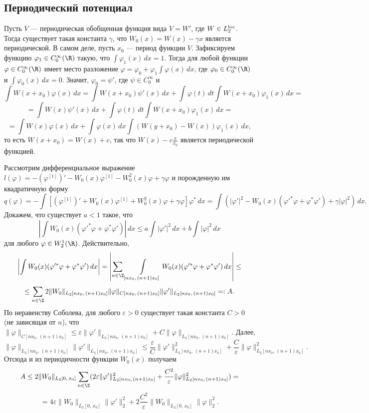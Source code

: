 \documentclass[a4paper
]{article}
\begin{document}
\subsection{Периодический потенциал}
Пусть $V$ --- периодическая обобщенная функция вида $V=W'$, где $W\in
L_2^{{\rm loc}}$. Тогда существует такая константа $\gamma$, что
$W_0(x)=W(x)-\gamma x$ является периодической. В самом деле, пусть
$x_0$ --- период функции $V$. Зафиксируем
функцию $\varphi_1\in C_0^\infty(\R)$ такую, что $\int \varphi_1(x)\, dx
=1$. Тогда для любой функции $\varphi\in C_0^\infty(\R)$ имеет
место разложение $\varphi=\varphi_0+\varphi_1\int \varphi(x)\, dx$,
где $\varphi_0\in C_0^\infty(\R)$ и $\int \varphi_0(x)\, dx=0$.
Значит, $\varphi_0=\psi'$, где $\psi\in C_0^\infty$ и
$$\int W(x+x_0)\varphi(x)\, dx=\int W(x+x_0)\psi'(x)\, dx+\int \varphi(t)
\, dt\int W(x+x_0)\varphi_1(x)\, dx=$$ $$=\int W(x)\psi'(x)\, dx+
\int \varphi(t)\, dt\int W(x+x_0)\varphi_1(x)\, dx=$$ $$=\int W(x)
\varphi(x)\, dx+\int \varphi(x)\, dx\int (W(y+x_0)-W(x))\varphi_1(x)\, dx,$$
то есть $W(x+x_0)=W(x)+c$, так что $W(x)-c\frac{x}{x_0}$ является
периодической функцией. \par
Рассмотрим дифференциальное выражение $l(\varphi)=-(\varphi^{[1]})'-W_0(x)
\varphi^{[1]}-W_0^2(x)\varphi +\gamma \varphi$ и порожденную им квадратичную
форму $$q(\varphi)=-\int [(\varphi ^{[1]})'+W_0(x)\varphi ^{[1]}+W_0^2(x)
\varphi +\gamma \varphi]\varphi ^*\, dx=\int (|\varphi '|^2-W_0(x)(\varphi '^*
\varphi +\varphi ^*\varphi ')+\gamma |\varphi |^2)\, dx.$$ Докажем, что
существует $a<1$ такое, что
$$\left|\int W_0(x)(\varphi'^*\varphi+\varphi^*\varphi')\right|\, dx\le
a\int |\varphi'|^2\, dx+b\int |\varphi|^2\, dx$$
для любого $\varphi\in W^1_2(\R)$. Действительно,
$$\left|\int W_0(x)(\varphi'^*\varphi+\varphi^*
\varphi')\, dx\right|=\left|\sum\limits_{n\in \Z}\int\limits_{[nx_0, \,
(n+1)x_0]} W_0(x)(\varphi'^*\varphi+\varphi^*\varphi')\, dx\right|\le$$
$$\le \sum \limits_{n\in \Z}2\|W_0\|_{L_2[nx_0, \, (n+1)x_0]}\|\varphi\|
_{C[nx_0, \, (n+1)x_0]}\|\varphi'\|_{L_2[nx_0, \, (n+1)x_0]}=:A.$$
По неравенству Соболева, для любого $\varepsilon>0$ существует такая
константа $C>0$ (не зависящая от $n$), что $\|\varphi\|_{C[nx_0, \,
(n+1)x_0]}\le \varepsilon\|\varphi'\|_{L_2[nx_0, \, (n+1)x_0]}+C\|\varphi\|
_{L_2[nx_0, \, (n+1)x_0]}$. Далее, $$\|\varphi\|_{L_2[nx_0, \, (n+1)x_0]}
\|\varphi'\|_{L_2[nx_0, \, (n+1)x_0]}\le \frac{\varepsilon}{C}\|\varphi'\|^2
_{L_2[nx_0, \, (n+1)x_0]}+\frac{C}{\varepsilon}\|\varphi\|^2_{L_2[nx_0, \,
(n+1)x_0]}.$$ Отсюда и из периодичности функции $W_0(x)$ получаем
$$A\le 2\|W_0\|_{L_2[0, \, x_0]}\sum \limits_{n\in \Z}(2\varepsilon
\|\varphi'\|^2_{L_2[nx_0, \, (n+1)x_0]}+\frac{C^2}{\varepsilon}\|\varphi\|^2
_{L_2[nx_0, \, (n+1)x_0]})=$$ $$=4\varepsilon\|W_0\|_{L_2[0, \, x_0]}
\|\varphi'\|^2_2+2\frac{C^2}{\varepsilon}\|W_0\|_{L_2[0, \, x_0]}
\|\varphi\|_2^2.$$
\end{document}
